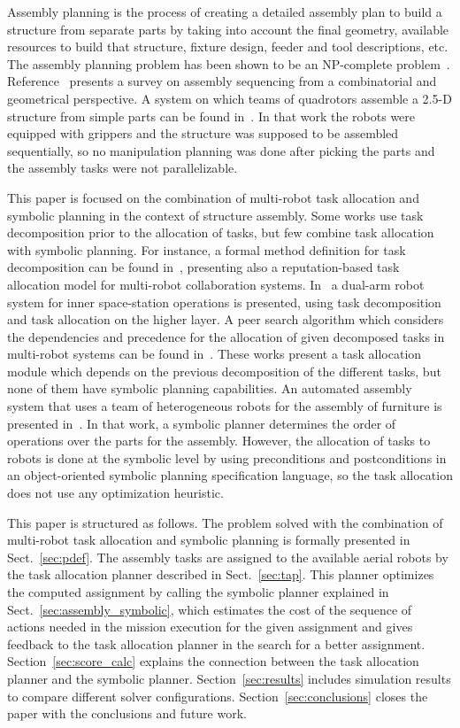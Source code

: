 \documentclass[letterpaper, 10 pt, conference]{ieeeconf}  %
\begin{document}
Assembly planning is the process of creating a detailed assembly plan to build a structure from separate parts by taking into account the final geometry, available resources to build that structure, fixture design, feeder and tool descriptions, etc. The assembly planning problem has been shown to be an NP-complete problem~\cite{Kavraki93}. Reference~\cite{Jimenez2011} presents a survey on assembly sequencing from a combinatorial and geometrical perspective. A system on which teams of quadrotors assemble a 2.5-D structure from simple parts can be found in~\cite{Lindsey-RSS-11}. In that work the robots were equipped with grippers and the structure was supposed to be assembled sequentially, so no manipulation planning was done after picking the parts and the assembly tasks were not parallelizable. 

This paper is focused on the combination of multi-robot task allocation and symbolic planning in the context of structure assembly. Some works use task decomposition prior to the allocation of tasks, but few combine task allocation with symbolic planning. For instance, a formal method definition for task decomposition can be found in~\cite{Shi2012}, presenting also a reputation-based task allocation model for multi-robot collaboration systems. In~\cite{Zhou2011} a dual-arm robot system for inner space-station operations is presented, using task decomposition and task allocation on the higher layer. A peer search algorithm which considers the dependencies and precedence for the allocation of given decomposed tasks in multi-robot systems can be found in~\cite{Nagarajan2014}. These works present a task allocation module which depends on the previous decomposition of the different tasks, but none of them have symbolic planning capabilities. An automated assembly system that uses a team of heterogeneous robots for the assembly of furniture is presented in~\cite{Knepper2013}. In that work, a symbolic planner determines the order of operations over the parts for the assembly. However, the allocation of tasks to robots is done at the symbolic level by using preconditions and postconditions in an object-oriented symbolic planning specification language, so the task allocation does not use any optimization heuristic. 

This paper is structured as follows. The problem solved with the combination of multi-robot task allocation and symbolic planning is formally presented in Sect.~\ref{sec:pdef}. The assembly tasks are assigned to the available aerial robots by the task allocation planner described in Sect.~\ref{sec:tap}. This planner optimizes the computed assignment by calling the symbolic planner explained in Sect.~\ref{sec:assembly_symbolic}, which estimates the cost of the sequence of actions needed in the mission execution for the given assignment and gives feedback to the task allocation planner in the search for a better assignment. Section~\ref{sec:score_calc} explains the connection between the task allocation planner and the symbolic planner. Section~\ref{sec:results} includes simulation results to compare different solver configurations. Section~\ref{sec:conclusions} closes the paper with the conclusions and future work.
\end{document}

